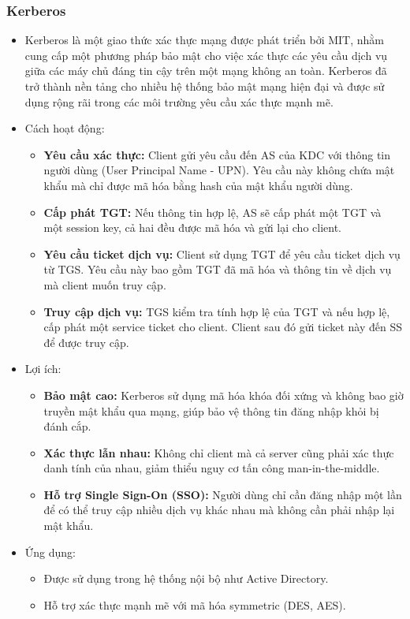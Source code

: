 \subsubsection{Kerberos}
\begin{itemize}
    \item Kerberos là một giao thức xác thực mạng được phát triển bởi MIT, nhằm cung cấp một phương pháp bảo mật cho việc xác thực các yêu cầu dịch vụ giữa các máy chủ đáng tin cậy trên một mạng không an toàn. Kerberos đã trở thành nền tảng cho nhiều hệ thống bảo mật mạng hiện đại và được sử dụng rộng rãi trong các môi trường yêu cầu xác thực mạnh mẽ.
    \item Cách hoạt động:
    \begin{itemize}
        \item \textbf{Yêu cầu xác thực:} Client gửi yêu cầu đến AS của KDC với thông tin người dùng (User Principal Name - UPN). Yêu cầu này không chứa mật khẩu mà chỉ được mã hóa bằng hash của mật khẩu người dùng.
        \item \textbf{Cấp phát TGT:} Nếu thông tin hợp lệ, AS sẽ cấp phát một TGT và một session key, cả hai đều được mã hóa và gửi lại cho client.
        \item \textbf{Yêu cầu ticket dịch vụ:} Client sử dụng TGT để yêu cầu ticket dịch vụ từ TGS. Yêu cầu này bao gồm TGT đã mã hóa và thông tin về dịch vụ mà client muốn truy cập.

        \item \textbf{Truy cập dịch vụ:} TGS kiểm tra tính hợp lệ của TGT và nếu hợp lệ, cấp phát một service ticket cho client. Client sau đó gửi ticket này đến SS để được truy cập.

    \end{itemize}
    \item Lợi ích:
    \begin{itemize}
        \item \textbf{Bảo mật cao:} Kerberos sử dụng mã hóa khóa đối xứng và không bao giờ truyền mật khẩu qua mạng, giúp bảo vệ thông tin đăng nhập khỏi bị đánh cắp.
        \item \textbf{Xác thực lẫn nhau:} Không chỉ client mà cả server cũng phải xác thực danh tính của nhau, giảm thiểu nguy cơ tấn công man-in-the-middle.

        \item \textbf{Hỗ trợ Single Sign-On (SSO):} Người dùng chỉ cần đăng nhập một lần để có thể truy cập nhiều dịch vụ khác nhau mà không cần phải nhập lại mật khẩu.

    \end{itemize}
    \item Ứng dụng:
    \begin{itemize}
        \item Được sử dụng trong hệ thống nội bộ như Active Directory.
        \item Hỗ trợ xác thực mạnh mẽ với mã hóa symmetric (DES, AES).
    \end{itemize}
\end{itemize}

